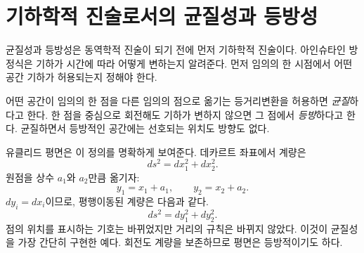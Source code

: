 \begin{classroomqa}
\end{classroomqa}

\section{기하학적 진술로서의 균질성과 등방성}

균질성과 등방성은 동역학적 진술이 되기 전에 먼저 기하학적 진술이다. 아인슈타인 방정식은 기하가 시간에 따라 어떻게 변하는지 알려준다. 먼저 임의의 한 시점에서 어떤 공간 기하가 허용되는지 정해야 한다.

\begin{classroomqa}
\end{classroomqa}

\begin{definition}
어떤 공간이 임의의 한 점을 다른 임의의 점으로 옮기는 등거리변환을 허용하면 \emph{균질}하다고 한다. 한 점을 중심으로 회전해도 기하가 변하지 않으면 그 점에서 \emph{등방}하다고 한다. 균질하면서 등방적인 공간에는 선호되는 위치도 방향도 없다.
\end{definition}

유클리드 평면은 이 정의를 명확하게 보여준다. 데카르트 좌표에서 계량은
\begin{equation}
ds^2=dx_1^2+dx_2^2.
\label{eq:c04-flat-metric}
\end{equation}
원점을 상수 \(a_1\)와 \(a_2\)만큼 옮기자:
\begin{equation}
y_1=x_1+a_1,
\qquad
y_2=x_2+a_2.
\label{eq:c04-flat-translation}
\end{equation}
\(dy_i=dx_i\)이므로, 평행이동된 계량은 다음과 같다.
\begin{equation}
ds^2=dy_1^2+dy_2^2.
\end{equation}
점의 위치를 표시하는 기호는 바뀌었지만 거리의 규칙은 바뀌지 않았다. 이것이 균질성을 가장 간단히 구현한 예다. 회전도 계량을 보존하므로 평면은 등방적이기도 하다.

